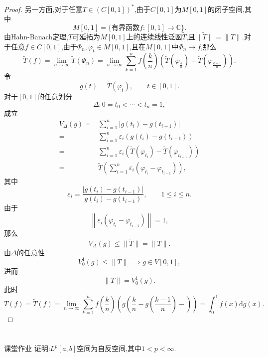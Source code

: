 \documentclass[lang = cn, scheme = chinese]{elegantbook}
\begin{document}
\begin{proof}
		另一方面,对于任意$T\in (C[0,1])^*$,由于$C[0,1]$为$M[0,1]$的闭子空间,其中
		$$
		M[0,1]=\{\text{有界函数}f:[0,1]\to \mathbb{C}\}.
		$$
		由Hahn-Banach定理,$T$可延拓为$M[0,1]$上的连续线性泛函$\tilde{T}$,且$\|\tilde{T}\|=\|T\|$.对于任意$f\in C[0,1]$,由于$\Phi_n,\varphi_t\in M[0,1]$,且在$M[0,1]$中$\Phi_n\to f$,那么
		$$
		\tilde{T}(f)
		= \lim_{n\to\infty}\tilde{T}(\Phi_n)
		= \lim_{n\to\infty}\sum_{k=1}^{n}f\left(\frac{k}{n}\right)\left(\tilde{T}\left(\varphi_{\frac{k}{n}}\right)-\tilde{T}\left(\varphi_{\frac{k-1}{n}}\right)\right).
		$$
		令
		$$
		g(t)=\tilde{T}(\varphi_t),\qquad t\in [0,1].
		$$
		对于$[0,1]$的任意划分
		$$
		\Delta:0=t_0<\cdots<t_n=1,
		$$
		成立
		\begin{align*}
			V_\Delta(g)
			= & \sum_{i=1}^{n}|g(t_i)-g(t_{i-1})|\\
			= & \sum_{i=1}^{n}\varepsilon_i(g(t_i)-g(t_{i-1}))\\
			= & \sum_{i=1}^{n}\varepsilon_i(\tilde{T}(\varphi_{t_i})-\tilde{T}(\varphi_{t_{i-1}}))\\
			= & \tilde{T}\left(\sum_{i=1}^{n}\varepsilon_i(\varphi_{t_i}-\varphi_{t_{i-1}})\right),
		\end{align*}
		其中
		$$
		\varepsilon_i=\frac{|g(t_i)-g(t_{i-1})|}{g(t_i)-g(t_{i-1})},\qquad 1\le i\le n.
		$$
		由于
		$$
		\left\| \varepsilon_i(\varphi_{t_i}-\varphi_{t_{i-1}}) \right\|=1,
		$$
		那么
		$$
		V_\Delta(g)\le \|\tilde{T}\| = \|T\|.
		$$
		由$\Delta$的任意性
		$$
		V_0^1(g)\le \|T\|\implies g\in V[0,1],
		$$
		进而
		$$
		\|T\|=V_0^1(g).
		$$
		此时
		$$
		T(f)=\tilde{T}(f)
		= \lim_{n\to\infty}\sum_{k=1}^{n}f\left(\frac{k}{n}\right)\left(g\left(\frac{k}{n}-g\left(\frac{k-1}{n}\right)-\right)\right)
		= \int_0^1f(x)\mathrm{d}g(x).
		$$
	\end{proof}
	
	\chapter{}
	
	\begin{proposition}{课堂作业}
		证明:$L^p[a,b]$空间为自反空间,其中$1<p<\infty$.
	\end{proposition}
\end{document}
